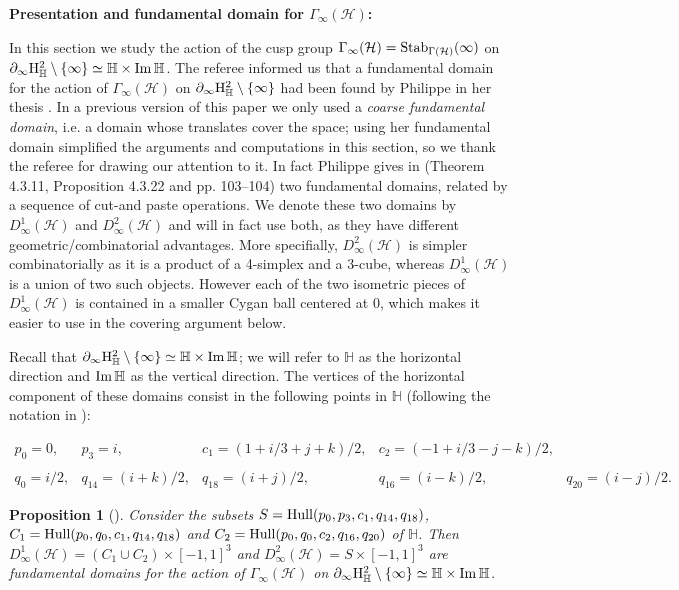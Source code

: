 \documentclass{article}[12pt]
\newcommand{\quat}{\mathbb{H}}
\newtheorem{prop}{Proposition}%
\begin{document}
{\bf Presentation and fundamental domain for $\Gamma_\infty(\mathcal{H})$:}

In this section we study the action of  the cusp group $\Gamma_\infty(\mathcal{H})={\rm Stab}_{\Gamma(\mathcal{H})}(\infty)$ on $\partial_\infty {\rm H}_\quat ^2 \setminus \{ \infty \} \simeq \quat \times {\rm Im} \, \quat$.
The referee informed us that a fundamental domain for the action of $\Gamma_\infty(\mathcal{H})$ on $\partial_\infty {\rm H}_\quat ^2 \setminus \{ \infty \}$ had been found by Philippe in her thesis \cite{Ph}. In a previous version of this paper we only used a \emph{coarse fundamental domain}, i.e. a domain whose translates cover the space; using her fundamental domain simplified the arguments and computations in this section, so we thank the referee for drawing our attention to it. In fact Philippe gives in \cite{Ph} (Theorem 4.3.11, Proposition 4.3.22 and pp. 103--104) two fundamental domains, related by a sequence of cut-and paste operations. We denote these two domains by $D^1_\infty(\mathcal{H})$ and $D^2_\infty(\mathcal{H})$ and will in fact use both, as they have different geometric/combinatorial advantages. More specifially, $D^2_\infty(\mathcal{H})$ is simpler combinatorially as it is a product of a 4-simplex and a 3-cube, whereas $D^1_\infty(\mathcal{H})$ is a union of two such objects. However each of the two isometric pieces of  $D^1_\infty(\mathcal{H})$ is contained in a smaller Cygan ball centered at 0, which makes it easier to use in the covering argument below.

Recall that $\partial_\infty {\rm H}_\quat ^2 \setminus \{ \infty \} \simeq \quat \times {\rm Im} \, \quat$; we will refer to $\quat$ as the horizontal direction and ${\rm Im} \, \quat$ as the vertical direction. The vertices of the horizontal component of these domains consist in the following points in $\quat$ (following the notation in \cite{Ph}):

$$\begin{array}{ccccc}\label{basepoints}
  p_0=0, & p_3=i, & c_1=(1+i/3+j+k)/2, & c_2=(-1+i/3-j-k)/2, & \\
    \\
   q_0=i/2,  & q_{14}=(i+k)/2, & q_{18}=(i+j)/2, & q_{16}=(i-k)/2, & q_{20}=(i-j)/ 2.  
\end{array}
$$

\begin{prop}[\cite{Ph}]\label{philippedomains} Consider the subsets $S={\rm Hull}(p_0,p_3,c_1,q_{14},q_{18})$, $C_1={\rm Hull}(p_0,q_0,c_1,q_{14},q_{18})$ and $C_2={\rm Hull}(p_0,q_0,c_2,q_{16},q_{20})$ of $\quat$. Then $D^1_\infty(\mathcal{H})=(C_1 \cup C_2) \times [-1,1]^3$ and $D^2_\infty(\mathcal{H})=S \times [-1,1]^3$ are fundamental domains for the action of $\Gamma_\infty(\mathcal{H})$ on $\partial_\infty {\rm H}_\quat ^2 \setminus \{ \infty \}\simeq \quat \times {\rm Im} \, \quat$.
\end{prop}  
\end{document}
